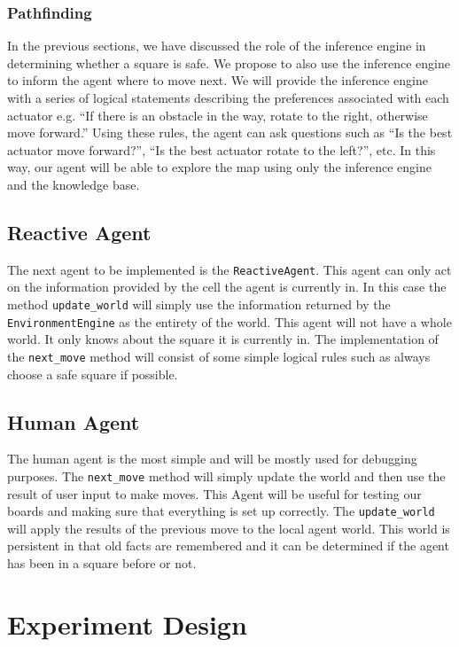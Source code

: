\documentclass{article}
\begin{document}
			
			\subsubsection{Pathfinding}
			
				In the previous sections, we have discussed the role of the inference engine in determining whether a square is safe. We propose to also use the inference engine to inform the agent where to move next.
				We will provide the inference engine with a series of logical statements describing the preferences associated with each actuator e.g. ``If there is an obstacle in the way, rotate to the right, otherwise move forward.'' Using these rules, the agent can ask questions such as ``Is the best actuator move forward?'', ``Is the best actuator rotate to the left?'', etc. In this way, our agent will be able to explore the map using only the inference engine and the knowledge base.
			
		\subsection{Reactive Agent}
			The next agent to be implemented is the \texttt{ReactiveAgent}. This agent can only act on the information provided by the cell the agent is currently in. In this case the method \texttt{update\_world} will simply use  the information returned by the \texttt{EnvironmentEngine} as the entirety of the world. This agent will not  have a whole world. It only knows about the square it is currently in. The implementation of the \texttt{next\_move} method will consist of some simple logical rules such as always choose a safe square if possible.
		
		\subsection{Human Agent}
		 The human agent is the most simple and will be mostly used for debugging purposes. The \texttt{next\_move} method will simply update the world and then use the result of user input to make moves. This Agent will be useful for testing our boards and making sure that everything is set up correctly. The \texttt{update\_world} will apply the results of the previous move to the local agent world. This world is persistent in that old facts are remembered and it can be determined if the agent has been in a square before or not. 
	\section{Experiment Design}
	
\end{document}
